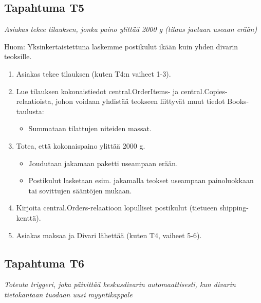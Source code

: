 \documentclass[11pt,a4paper]{article}
\begin{document}
\subsection{Tapahtuma T5}
{\large{\textit{Asiakas tekee tilauksen, jonka paino ylittää 2000 g (tilaus jaetaan useaan erään)}}}

Huom: Yksinkertaistettuna laskemme postikulut ikään kuin yhden divarin teoksille.

\begin{enumerate}
	\item Asiakas tekee tilauksen (kuten T4:n vaiheet 1-3).
	\item Lue tilauksen kokonaistiedot central.OrderItems- ja central.Copies-relaatioista, johon voidaan yhdistää teokseen liittyvät muut tiedot Books-taulusta:
	      \begin{itemize}
		      \item Summataan tilattujen niteiden massat.
	      \end{itemize}
	\item Totea, että kokonaispaino ylittää 2000 g.
	      \begin{itemize}
		      \item Joudutaan jakamaan paketti useampaan erään.
		      \item Postikulut lasketaan esim. jakamalla teokset useampaan painoluokkaan tai sovittujen sääntöjen mukaan.
	      \end{itemize}
	\item Kirjoita central.Orders-relaatioon lopulliset postikulut (tietueen shipping-kenttä).
	\item Asiakas maksaa ja Divari lähettää (kuten T4, vaiheet 5-6).
\end{enumerate}

\subsection{Tapahtuma T6}
{\large{\textit{Toteuta triggeri, joka päivittää keskusdivarin automaattisesti, kun divarin tietokantaan tuodaan uusi myyntikappale}}}
\end{document}
